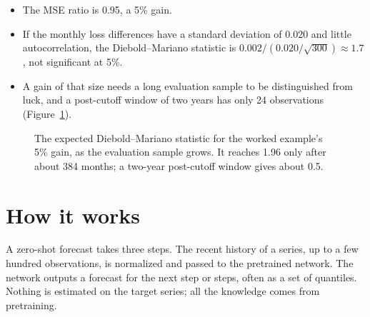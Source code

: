 \begin{itemize}
  \item The MSE ratio is 0.95, a 5\% gain.
  \item If the monthly loss differences have a standard deviation of 0.020 and little autocorrelation, the Diebold--Mariano statistic is $0.002 / (0.020/\sqrt{300}) \approx 1.7$, not significant at 5\%.
  \item A gain of that size needs a long evaluation sample to be distinguished from luck, and a post-cutoff window of two years has only 24 observations (Figure~\ref{fig:21-dm}).
\end{itemize}

\begin{figure}[htbp]
\centering
{}
\caption{The expected Diebold--Mariano statistic for the worked example's 5\% gain, as the evaluation sample grows. It reaches 1.96 only after about 384 months; a two-year post-cutoff window gives about 0.5.}
\label{fig:21-dm}
\end{figure}

\section{How it works}
\label{sec:21-how}

A zero-shot forecast takes three steps. The recent history of a series, up to a few hundred observations, is normalized and passed to the pretrained network. The network outputs a forecast for the next step or steps, often as a set of quantiles. Nothing is estimated on the target series; all the knowledge comes from pretraining.

